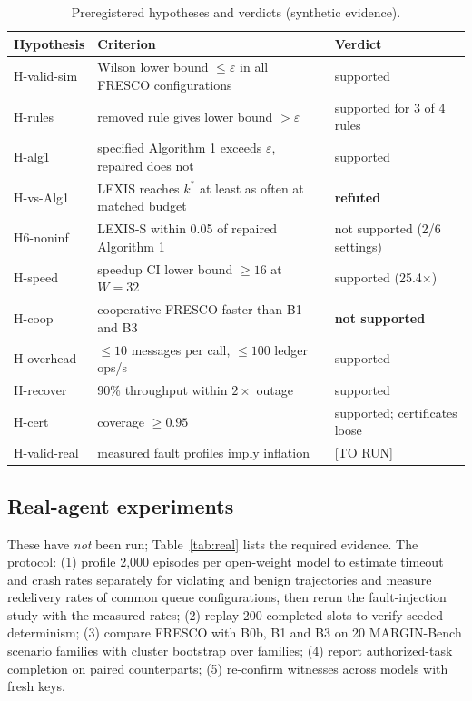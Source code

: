 \documentclass[11pt]{article}
\theoremstyle{definition}
\theoremstyle{remark}
\newcommand{\todo}[1]{\textcolor{red!70!black}{[#1]}}
\begin{document}
\begin{table}[t]\centering\small
\caption{Preregistered hypotheses and verdicts (synthetic evidence).}\label{tab:verdicts}
\begin{tabularx}{\linewidth}{lX>{\raggedright\arraybackslash}p{4.4cm}}
\toprule
Hypothesis & Criterion & Verdict \\\midrule
H-valid-sim & Wilson lower bound $\le\varepsilon$ in all FRESCO configurations & supported \\
H-rules & removed rule gives lower bound $>\varepsilon$ & supported for 3 of 4 rules \\
H-alg1 & specified Algorithm 1 exceeds $\varepsilon$, repaired does not & supported \\
H-vs-Alg1 & LEXIS reaches $k^*$ at least as often at matched budget & \textbf{refuted} \\
H6-noninf & LEXIS-S within 0.05 of repaired Algorithm 1 & not supported (2/6 settings) \\
H-speed & speedup CI lower bound $\ge16$ at $W=32$ & supported (25.4$\times$) \\
H-coop & cooperative FRESCO faster than B1 and B3 & \textbf{not supported} \\
H-overhead & $\le10$ messages per call, $\le100$ ledger ops/s & supported \\
H-recover & 90\% throughput within $2\times$ outage & supported \\
H-cert & coverage $\ge0.95$ & supported; certificates loose \\
H-valid-real & measured fault profiles imply inflation & \todo{TO RUN} \\
\bottomrule\end{tabularx}
\end{table}

\subsection{Real-agent experiments}\label{sec:realprotocol}
These have \emph{not} been run; Table~\ref{tab:real} lists the required evidence. The protocol: (1) profile 2,000 episodes per open-weight model to estimate timeout and crash rates separately for violating and benign trajectories and measure redelivery rates of common queue configurations, then rerun the fault-injection study with the measured rates; (2) replay 200 completed slots to verify seeded determinism; (3) compare FRESCO with B0b, B1 and B3 on 20 MARGIN-Bench scenario families with cluster bootstrap over families; (4) report authorized-task completion on paired counterparts; (5) re-confirm witnesses across models with fresh keys.
\end{document}
